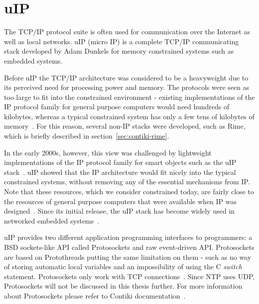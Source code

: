 
\section{uIP}\label{sec:contiki-uip}
The TCP/IP protocol suite is often used for communication over the Internet as well as local networks.
uIP (micro IP) is a complete TCP/IP communicating stack developed by Adam Dunkels
for memory constrained systems such as embedded systems.

Before uIP the TCP/IP architecture was considered to be a heavyweight
due to its perceived need for processing power and memory.
The protocols were seen as too large to fit into the constrained environment -
existing implementations of the IP protocol family for general purpose computers would need hundreds
of kilobytes, whereas a typical constrained system has only a few tens of kilobytes of memory~\cite{interconnecting}.
For this reason, several non-IP stacks were developed,
such as Rime, which is briefly described in section~\ref{sec:contiki-rime}.

In the early 2000s, however, this view was challenged by lightweight implementations of the IP
protocol family for smart objects such as the uIP stack~\cite{interconnecting}.
uIP showed that the IP architecture would fit nicely into the typical constrained systems,
without removing any of the essential mechanisms from IP.
Note that these resources, which we consider constrained today, are fairly close to the
resources of general purpose computers that were available when IP was designed~\cite{interconnecting}.
Since its initial release, the uIP stack has become widely used in networked
embedded systems~\cite{interconnecting, thesis-programming}.

uIP provides two different application programming interfaces to programmers:
a BSD sockets-like API called Protosockets and raw event-driven API.
Protosockets are based on Protothreads putting the same limitation on them - such as 
no way of storing automatic local variables and an impossibility of using the C {\it switch} statement.
Protosockets only work with TCP connections~\cite{contiki-docs}.
Since NTP uses UDP, Protosockets will not be
discussed in this thesis further. For more information about Protosockets
please refer to Contiki documentation~\cite{contiki-docs}.

